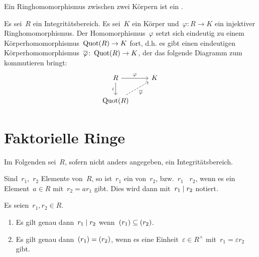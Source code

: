 
\begin{definition}
  Ein Ringhomomorphismus zwischen zwei Körpern ist ein .
\end{definition}

\begin{corollary}
  Es sei~$R$ ein Integritätsbereich.
  Es sei~$K$ ein Körper und~$\varphi \colon R \to K$ ein injektiver Ringhomomorphismus.
  Der Homomorphismus~$\varphi$ setzt sich eindeutig zu einem Körperhomomorphismus~$\Quot(R) \to K$ fort, d.h. es gibt einen eindeutigen Körperhomomorphismus~$\induced{\varphi} \colon \Quot(R) \to K$, der das folgende Diagramm zum kommutieren bringt:
  \[
    \begin{tikzcd}
      R
      \arrow{r}[above]{\varphi}
      \arrow{d}[left]{i}
      &
      K
      \\
      \Quot(R)
      \arrow[dashed]{ur}[below right]{\induced{\varphi}}
      &
      {}
    \end{tikzcd}
  \]
\end{corollary}





\section{Faktorielle Ringe}

\begin{convention}
  Im Folgenden sei~$R$, sofern nicht anders angegeben, ein Integritätsbereich.
\end{convention}

\begin{definition}
  Sind~$r_1$,~$r_2$ Elemente von~$R$, so ist~$r_1$ ein  von~$r_2$, bzw.~$r_1$ ~$r_2$, wenn es ein Element~$a \in R$ mit~$r_2 = a r_1$ gibt.
  Dies wird dann mit~$r_1 \mid r_2$ notiert.
\end{definition}

\begin{proposition}
  Es seien~$r_1, r_2 \in R$.
  \begin{enumerate}
    \item
      Es gilt genau dann~$r_1 \mid r_2$ wenn~$(r_1) \subseteq (r_2)$.
    \item
      Es gilt genau dann~$(r_1) = (r_2)$, wenn es eine Einheit~$\varepsilon \in R^\times$ mit~$r_1 = \varepsilon r_2$ gibt.
  \end{enumerate}
\end{proposition}



